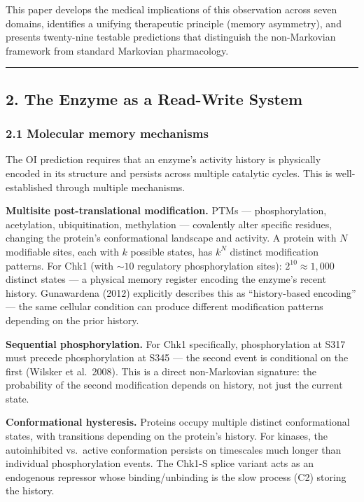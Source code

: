 \documentclass[
]{article}
\begin{document}
This paper develops the medical implications of this observation across
seven domains, identifies a unifying therapeutic principle (memory
asymmetry), and presents twenty-nine testable predictions that
distinguish the non-Markovian framework from standard Markovian
pharmacology.

\begin{center}\rule{0.5\linewidth}{0.5pt}\end{center}

\hypertarget{the-enzyme-as-a-read-write-system}{%
\subsection{2. The Enzyme as a Read-Write
System}\label{the-enzyme-as-a-read-write-system}}

\hypertarget{molecular-memory-mechanisms}{%
\subsubsection{2.1 Molecular memory
mechanisms}\label{molecular-memory-mechanisms}}

The OI prediction requires that an enzyme's activity history is
physically encoded in its structure and persists across multiple
catalytic cycles. This is well-established through multiple mechanisms.

\textbf{Multisite post-translational modification.} PTMs ---
phosphorylation, acetylation, ubiquitination, methylation --- covalently
alter specific residues, changing the protein's conformational landscape
and activity. A protein with \(N\) modifiable sites, each with \(k\)
possible states, has \(k^N\) distinct modification patterns. For Chk1
(with \(\sim 10\) regulatory phosphorylation sites):
\(2^{10} \approx 1{,}000\) distinct states --- a physical memory
register encoding the enzyme's recent history. Gunawardena (2012)
explicitly describes this as ``history-based encoding'' --- the same
cellular condition can produce different modification patterns depending
on the prior history.

\textbf{Sequential phosphorylation.} For Chk1 specifically,
phosphorylation at S317 must precede phosphorylation at S345 --- the
second event is conditional on the first (Wilsker et al.~2008). This is
a direct non-Markovian signature: the probability of the second
modification depends on history, not just the current state.

\textbf{Conformational hysteresis.} Proteins occupy multiple distinct
conformational states, with transitions depending on the protein's
history. For kinases, the autoinhibited vs.~active conformation persists
on timescales much longer than individual phosphorylation events. The
Chk1-S splice variant acts as an endogenous repressor whose
binding/unbinding is the slow process (C2) storing the history.
\end{document}
